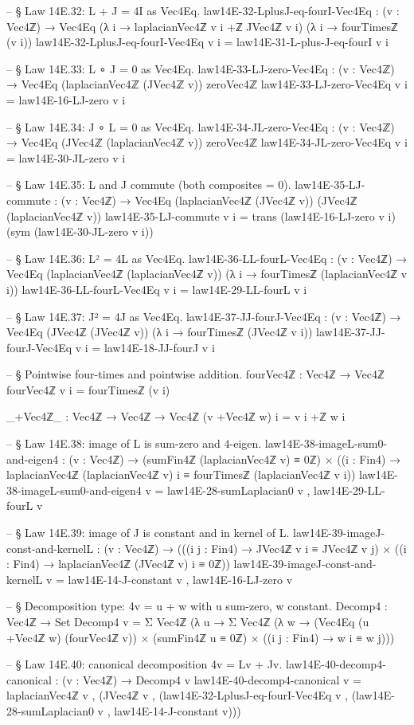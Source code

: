 \documentclass[11pt,a4paper]{book}
\begin{document}
\begin{code}
-- § Law 14E.32: L + J = 4I as Vec4Eq.
law14E-32-LplusJ-eq-fourI-Vec4Eq : (v : Vec4ℤ) →
  Vec4Eq (λ i → laplacianVec4ℤ v i +ℤ JVec4ℤ v i) (λ i → fourTimesℤ (v i))
law14E-32-LplusJ-eq-fourI-Vec4Eq v i = law14E-31-L-plus-J-eq-fourI v i

-- § Law 14E.33: L ∘ J = 0 as Vec4Eq.
law14E-33-LJ-zero-Vec4Eq : (v : Vec4ℤ) →
  Vec4Eq (laplacianVec4ℤ (JVec4ℤ v)) zeroVec4ℤ
law14E-33-LJ-zero-Vec4Eq v i = law14E-16-LJ-zero v i

-- § Law 14E.34: J ∘ L = 0 as Vec4Eq.
law14E-34-JL-zero-Vec4Eq : (v : Vec4ℤ) →
  Vec4Eq (JVec4ℤ (laplacianVec4ℤ v)) zeroVec4ℤ
law14E-34-JL-zero-Vec4Eq v i = law14E-30-JL-zero v i

-- § Law 14E.35: L and J commute (both composites = 0).
law14E-35-LJ-commute : (v : Vec4ℤ) →
  Vec4Eq (laplacianVec4ℤ (JVec4ℤ v)) (JVec4ℤ (laplacianVec4ℤ v))
law14E-35-LJ-commute v i =
  trans (law14E-16-LJ-zero v i) (sym (law14E-30-JL-zero v i))

-- § Law 14E.36: L² = 4L as Vec4Eq.
law14E-36-LL-fourL-Vec4Eq : (v : Vec4ℤ) →
  Vec4Eq (laplacianVec4ℤ (laplacianVec4ℤ v)) (λ i → fourTimesℤ (laplacianVec4ℤ v i))
law14E-36-LL-fourL-Vec4Eq v i = law14E-29-LL-fourL v i

-- § Law 14E.37: J² = 4J as Vec4Eq.
law14E-37-JJ-fourJ-Vec4Eq : (v : Vec4ℤ) →
  Vec4Eq (JVec4ℤ (JVec4ℤ v)) (λ i → fourTimesℤ (JVec4ℤ v i))
law14E-37-JJ-fourJ-Vec4Eq v i = law14E-18-JJ-fourJ v i

-- § Pointwise four-times and pointwise addition.
fourVec4ℤ : Vec4ℤ → Vec4ℤ
fourVec4ℤ v i = fourTimesℤ (v i)

_+Vec4ℤ_ : Vec4ℤ → Vec4ℤ → Vec4ℤ
(v +Vec4ℤ w) i = v i +ℤ w i

-- § Law 14E.38: image of L is sum-zero and 4-eigen.
law14E-38-imageL-sum0-and-eigen4 : (v : Vec4ℤ) →
  (sumFin4ℤ (laplacianVec4ℤ v) ≡ 0ℤ) × ((i : Fin4) → laplacianVec4ℤ (laplacianVec4ℤ v) i ≡ fourTimesℤ (laplacianVec4ℤ v i))
law14E-38-imageL-sum0-and-eigen4 v =
  law14E-28-sumLaplacian0 v , law14E-29-LL-fourL v

-- § Law 14E.39: image of J is constant and in kernel of L.
law14E-39-imageJ-const-and-kernelL : (v : Vec4ℤ) →
  (((i j : Fin4) → JVec4ℤ v i ≡ JVec4ℤ v j) × ((i : Fin4) → laplacianVec4ℤ (JVec4ℤ v) i ≡ 0ℤ))
law14E-39-imageJ-const-and-kernelL v =
  law14E-14-J-constant v , law14E-16-LJ-zero v

-- § Decomposition type: 4v = u + w with u sum-zero, w constant.
Decomp4 : Vec4ℤ → Set
Decomp4 v =
  Σ Vec4ℤ (λ u →
    Σ Vec4ℤ (λ w →
      (Vec4Eq (u +Vec4ℤ w) (fourVec4ℤ v)) ×
      (sumFin4ℤ u ≡ 0ℤ) ×
      ((i j : Fin4) → w i ≡ w j)))

-- § Law 14E.40: canonical decomposition 4v = Lv + Jv.
law14E-40-decomp4-canonical : (v : Vec4ℤ) → Decomp4 v
law14E-40-decomp4-canonical v =
  laplacianVec4ℤ v ,
  (JVec4ℤ v ,
    (law14E-32-LplusJ-eq-fourI-Vec4Eq v ,
     (law14E-28-sumLaplacian0 v ,
      law14E-14-J-constant v)))
\end{code}
\end{document}
